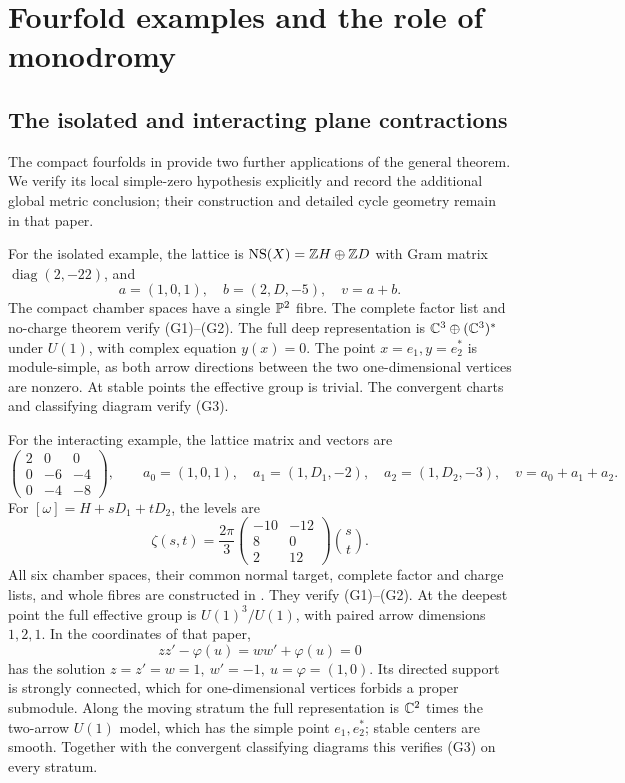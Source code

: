 \section{Fourfold examples and the role of monodromy}\label{sec:examples}

\subsection{The isolated and interacting plane contractions}
The compact fourfolds in \cite{wuebben17} provide two further
applications of the general theorem. We verify its local
simple-zero hypothesis explicitly and record the additional
global metric conclusion; their construction and detailed cycle
geometry remain in that paper.

For the isolated example, the lattice is
\(\operatorname{NS}(X)=\mathbb Z H\oplus\mathbb Z D\) with Gram matrix
\(\operatorname{diag}(2,-22)\), and
\[
 a=(1,0,1),\quad b=(2,D,-5),\quad v=a+b.
\]
The compact chamber spaces have a single \(\mathbb P^2\) fibre.
The complete factor list and no-charge theorem
\cite[Section~3]{wuebben17} verify (G1)--(G2).
The full deep representation is
\(\mathbb C^3\oplus(\mathbb C^3)^*\) under \(U(1)\), with complex equation
\(y(x)=0\). The point \(x=e_1,y=e_2^*\) is module-simple,
as both arrow directions between the two one-dimensional
vertices are nonzero. At stable points the effective group
is trivial. The convergent charts and classifying diagram
verify (G3).

For the interacting example, the lattice matrix and vectors are
\[
 \begin{pmatrix}2&0&0\\0&-6&-4\\0&-4&-8\end{pmatrix},\qquad
 a_0=(1,0,1),\quad a_1=(1,D_1,-2),\quad a_2=(1,D_2,-3),
 \quad v=a_0+a_1+a_2 .
\]
For \([\omega]=H+sD_1+tD_2\), the levels are
\[
 \zeta(s,t)=\frac{2\pi}{3}
 \begin{pmatrix}-10&-12\\8&0\\2&12\end{pmatrix}
 \binom{s}{t}.
\]
All six chamber spaces, their common normal target, complete
factor and charge lists, and whole fibres are constructed in
\cite[Sections~4--5]{wuebben17}. They verify (G1)--(G2).
At the deepest point the full effective group is
\(U(1)^3/U(1)\), with paired arrow dimensions \(1,2,1\).
In the coordinates of that paper,
\[
 zz'-\varphi(u)=ww'+\varphi(u)=0
\]
has the solution \(z=z'=w=1,\ w'=-1,\ u=\varphi=(1,0)\).
Its directed support is strongly connected, which for
one-dimensional vertices forbids a proper submodule.
Along the moving stratum the full representation is
\(\mathbb C^2\) times the two-arrow \(U(1)\) model, which has
the simple point \(e_1,e_2^*\); stable centers are smooth.
Together with the convergent classifying diagrams this verifies
(G3) on every stratum.


